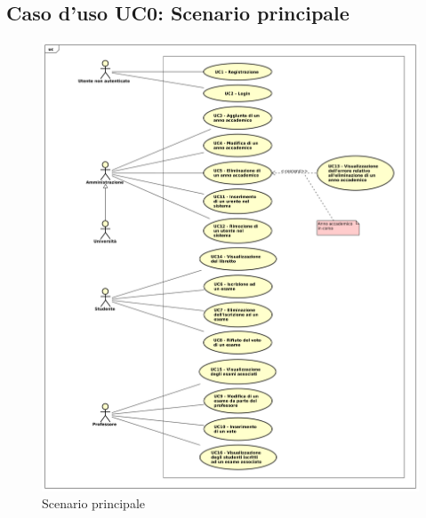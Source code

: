 \subsection{Caso d'uso \texorpdfstring{UC0}{UC0}: Scenario principale }
\begin{figure} [H]
	\centering
	\includegraphics[scale=0.4]{./img/UC0.pdf}
	\caption{Scenario principale }\label{}
\end{figure}
